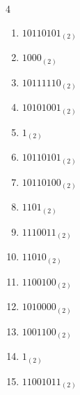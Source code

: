 \begin{multicols}{4}
\begin{enumerate}
        \phantom{$=105$}

  \item $10110101_{(2)}$

        \phantom{$=181$}

\columnbreak %

\resetques

  \item $1000_{(2)}$

        \phantom{$=8$}

  \item $10111110_{(2)}$

        \phantom{$=190$}

  \item $10101001_{(2)}$

        \phantom{$=169$}

  \item $1_{(2)}$

        \phantom{$=1$}

  \item $10110101_{(2)}$

        \phantom{$=181$}

  \item $10110100_{(2)}$

        \phantom{$=180$}

  \item $1101_{(2)}$

        \phantom{$=13$}

  \item $1110011_{(2)}$

        \phantom{$=115$}

  \item $11010_{(2)}$

        \phantom{$=26$}

  \item $1100100_{(2)}$

        \phantom{$=100$}

  \item $1010000_{(2)}$

        \phantom{$=80$}

  \item $1001100_{(2)}$

        \phantom{$=76$}

  \item $1_{(2)}$

        \phantom{$=1$}

  \item $11001011_{(2)}$


\end{enumerate}
\end{multicols}
